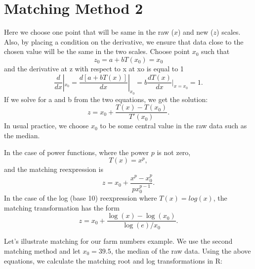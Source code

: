 \documentclass[
]{book}
\newenvironment{Shaded}{\begin{snugshade}}{\end{snugshade}}
\newcommand{\DecValTok}[1]{\textcolor[rgb]{0.00,0.00,0.81}{#1}}
\newcommand{\FloatTok}[1]{\textcolor[rgb]{0.00,0.00,0.81}{#1}}
\newcommand{\FunctionTok}[1]{\textcolor[rgb]{0.00,0.00,0.00}{#1}}
\newcommand{\NormalTok}[1]{#1}
\newcommand{\OtherTok}[1]{\textcolor[rgb]{0.56,0.35,0.01}{#1}}
\newcommand{\SpecialCharTok}[1]{\textcolor[rgb]{0.00,0.00,0.00}{#1}}
\begin{document}
\hypertarget{matching-method-2}{%
\section{Matching Method 2}\label{matching-method-2}}

Here we choose one point that will be same in the raw (\(x\)) and new (\(z\)) scales. Also, by placing a condition on the derivative, we ensure that data close to the chosen value will be the same in the two scales. Choose point \(x_0\) such that
\[
z_0 = a + b T(x_0) = x_0
\]
and the derivative at z with respect to x at xo is equal to 1
\[
\frac{d}{dx}|_{x_0} = \frac{d[a+bT(x)]}{dx}|_{x_0}= b \frac{d T(x)}{dx}|_{x=x_0} = 1.
\]
If we solve for a and b from the two equations, we get the solution:
\[
z = x_0 + \frac{T(x) - T(x_0)}{T'(x_0)}.
\]
In usual practice, we choose \(x_0\) to be some central value in the raw data such as the median.

In the case of power functions, where the power \(p\) is not zero,
\[
T(x) = x^p,
\]
and the matching reexpression is
\[
z = x_0 + \frac{x^p - x_0^p}{p x_0^{p-1}}.
\]
In the case of the log (base 10) reexpression where \(T(x) = log(x)\), the matching transformation has the form
\[
z = x_0 + \frac{\log(x) -\log(x_0)}{\log(e)/x_0}.
\]

Let's illustrate matching for our farm numbers example. We use the second matching method and let \(x_0 = 39.5\), the median of the raw data. Using the above equations, we calculate the matching root and log transformations in R:

\begin{Shaded}
\end{Shaded}
\end{document}
